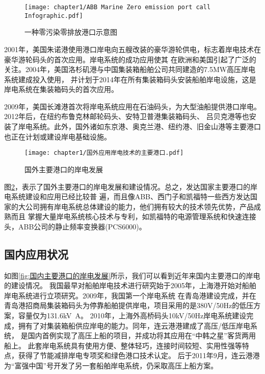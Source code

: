 \begin{figure}[!htp]
	\centering
	\texttt{[image: chapter1/ABB Marine Zero emission port call Infographic.pdf]}
	\caption{一种零污染零排放港口示意图}
	\label{fig:一种零污染零排放港口示意图}
\end{figure}

2001年，美国朱诺港使用港口岸电向五艘改装的豪华游轮供电，标志着岸电技术在豪华游轮码头的首次应用。岸电系统的成功应用使其
在欧洲和美国引起了广泛的关注。2004年，美国洛杉矶港与中国集装箱船舶公司共同建造的7.5\si{MW}高压岸电系统建成投入使用\cite{SP5}，
并计划于2014年在所有集装箱码头安装船舶岸电设施，这是岸电系统在集装箱码头的首次应用。

2009年，美国长滩港首次将岸电系统应用在石油码头，为大型油船提供港口岸电。2012年后，在纽约布鲁克林邮轮码头、安特卫普港集装箱码头、
吕贝克港等也安装了岸电系统。此外，国外诸如东京港、奥克兰港、纽约港、旧金山港等主要港口也正在计划或建设岸电基础设施\cite{SP6}。

\begin{figure}[!htp]
	\centering
	\texttt{[image: chapter1/国外应用岸电技术的主要港口.pdf]}
	\caption{国外主要港口的岸电发展}
	\label{fig:国外主要港口的岸电发展}
\end{figure}

图\ref{fig:国外主要港口的岸电发展}，表示了国外主要港口的岸电发展和建设情况。总之，发达国家主要港口的岸电系统建设和应用已经比较普
遍，而且像ABB、西门子和凯福特一些西方发达国家的大公司拥有岸电系统总体建设的能力，他们拥有较大的技术领先优势，产品成熟而且
掌握大量岸电系统核心技术与专利，如凯福特的电源管理系统和快速连接头，ABB公司的静止频率变换器(PCS6000)\cite{SP5}。

\subsection{国内应用状况}

如图\ref{fig:国内主要港口的岸电发展}所示，我们可以看到近年来国内主要港口的岸电的建设情况。
我国最早对船舶岸电技术进行研究始于2005年，上海港开始对船舶岸电系统进行立项研究。2009年，我国第一个岸电系统
在青岛港建设完成，并在青岛港招商局集装箱码头为停靠船舶提供岸电，项目采用的是380V/50Hz的低压方案，容量仅为131.6\si{kV.A}。
2010年，上海外高桥码头10kV/50Hz岸电系统建设完成，拥有了对集装箱船供应岸电的能力。同年，连云港港建成了高压/低压岸电系统，
是国内首例实现了高压上船的项目，并成功将其应用在“中韩之星”客货两用船上\cite{SP4}。
此套岸电系统具有使用方便、整体轻巧，连接时间较短、实用性强等特点，获得了节能减排岸电专项奖和绿色港口技术认定\cite{SP8}。
后于2011年9月，连云港港为“富强中国”号开发了另一套船舶岸电系统，仍采取高压上船方案。

